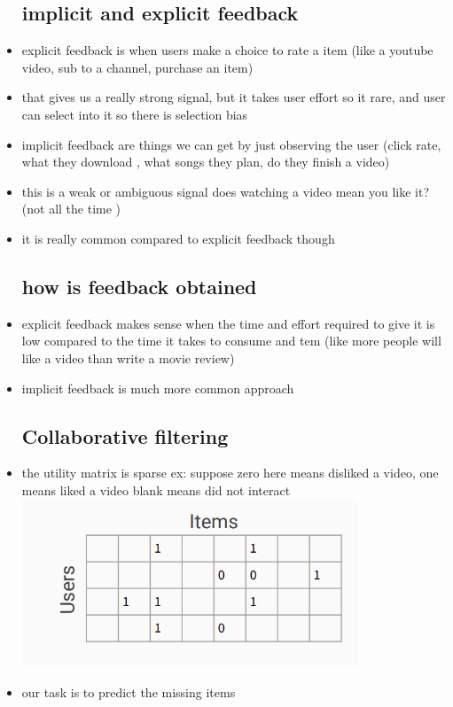 \documentclass{article}
\begin{document}
\begin{itemize}
\subsection*{implicit and explicit feedback}
\item explicit feedback is when users make a choice to rate a item (like a youtube video, sub to a channel, purchase an item)
\item that gives us a really strong signal, but it takes user effort so it rare, and user can select into it so there is selection bias 
\item implicit feedback are things we can get by just observing the user (click rate, what they download , what songs they plan, do they finish a video)
\item this is a weak or ambiguous signal does watching a video mean you like it? (not all the time )
\item it is really common compared to explicit feedback though 
\subsection*{how is feedback obtained }
\item explicit feedback makes sense when the time and effort required to give it is low compared to the time it takes to consume and tem (like more people will like a video than write a movie review)
\item implicit feedback is much more common approach
\subsection*{Collaborative filtering}
\item the utility matrix is sparse  ex: suppose zero here means disliked a video, one means liked a video blank means did not interact  \\ \includegraphics*[width=10cm]{images/Screenshot 2023-05-11 at 5.14.16 PM.png}
\item our task is to predict the missing items

\end{itemize}
\end{document}
